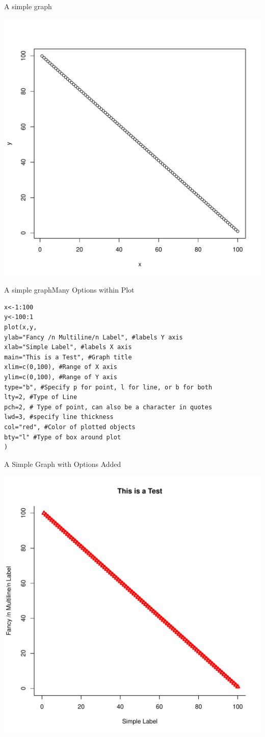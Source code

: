 \documentclass{beamer}
\begin{document}
\begin{frame}[fragile]{A simple graph}
\begin{center}
\includegraphics[width=.8\linewidth]{simpleplot.pdf}
\end{center}
\end{frame}
\begin{frame}[fragile]{A simple graph}{Many Options within Plot}
\begin{verbatim}
x<-1:100
y<-100:1
plot(x,y,
ylab="Fancy /n Multiline/n Label", #labels Y axis
xlab="Simple Label", #labels X axis
main="This is a Test", #Graph title
xlim=c(0,100), #Range of X axis
ylim=c(0,100), #Range of Y axis
type="b", #Specify p for point, l for line, or b for both
lty=2, #Type of Line
pch=2, # Type of point, can also be a character in quotes
lwd=3, #specify line thickness
col="red", #Color of plotted objects
bty="l" #Type of box around plot
)
\end{verbatim}
\end{frame}
\begin{frame}[fragile]{A Simple Graph with Options Added}
\begin{center}
\includegraphics[width=.8\linewidth]{moreoptions.pdf}
\end{center}
\end{frame}
\end{document}
